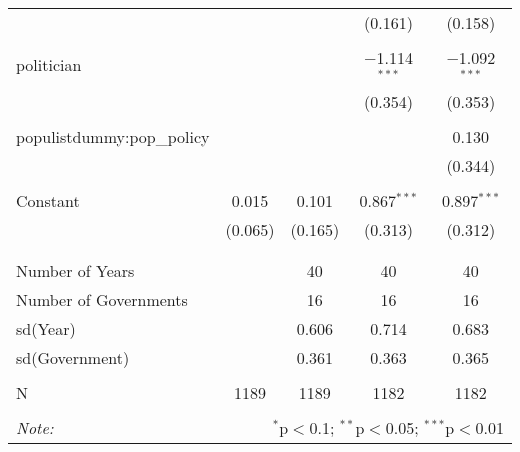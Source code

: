 \begin{table}[!htbp]
\begin{tabular}{@{\extracolsep{5pt}}lcccc}
  &  &  & (0.161) & (0.158) \\ 
  & & & & \\ 
 politician &  &  & $-$1.114$^{***}$ & $-$1.092$^{***}$ \\ 
  &  &  & (0.354) & (0.353) \\ 
  & & & & \\ 
 populistdummy:pop\_policy &  &  &  & 0.130 \\ 
  &  &  &  & (0.344) \\ 
  & & & & \\ 
 Constant & 0.015 & 0.101 & 0.867$^{***}$ & 0.897$^{***}$ \\ 
  & (0.065) & (0.165) & (0.313) & (0.312) \\ 
  & & & & \\ 
\hline \\[-1.8ex] 
Number of Years &  & 40 & 40 & 40 \\ 
Number of Governments &  & 16 & 16 & 16 \\ 
sd(Year) &  & 0.606 & 0.714 & 0.683 \\ 
sd(Government) &  & 0.361 & 0.363 & 0.365 \\ 
 &  &  &  &  \\ 
N & 1189 & 1189 & 1182 & 1182 \\ 
\hline 
\hline \\[-1.8ex] 
\textit{Note:}  & \multicolumn{4}{r}{$^{*}$p$<$0.1; $^{**}$p$<$0.05; $^{***}$p$<$0.01} \\ 
\end{tabular} 
\end{table} 
